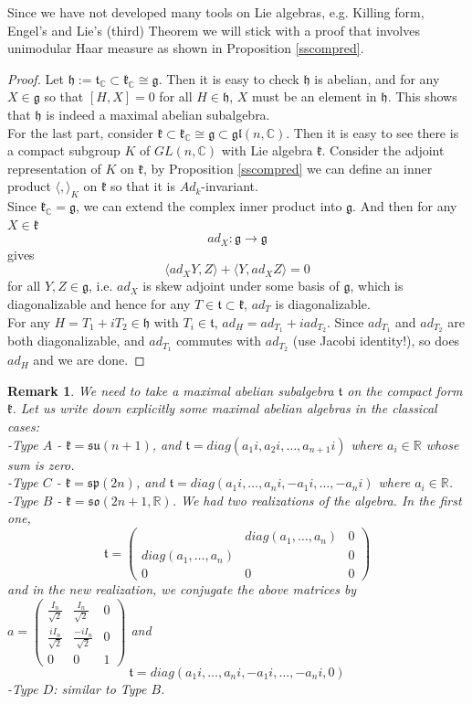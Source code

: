 \documentclass[11pt]{book}
\newtheorem{remark}[theorem]{Remark}
\newcommand{\bb}[1]{\mathbb{#1}}
\newcommand{\mf}[1]{\mathfrak{#1}}
\begin{document}
Since we have not developed many tools on Lie algebras, e.g. Killing form, Engel's and Lie's (third) Theorem we will stick with a proof that involves unimodular Haar measure as shown in Proposition \ref{sscompred}.
\begin{proof}
Let $\mf{h} := \mf{t}_{\bb{C}} \subset \mf{k}_{\bb{C}} \cong \mf{g}$. Then it is easy to check $\mf{h}$ is abelian, and for any $X \in \mf{g}$ so that $[H,X] = 0$ for all $H \in \mf{h}$, $X$ must be an element in $\mf{h}$. This shows that $\mf{h}$ is indeed a maximal abelian subalgebra.\\
For the last part, consider $\mf{k} \subset \mf{k}_{\bb{C}} \cong \mf{g} \subset \mf{gl}(n,\bb{C})$. Then it is easy to see there is a compact subgroup $K$ of $GL(n,\bb{C})$ with Lie algebra $\mf{k}$. Consider the adjoint representation of $K$ on $\mf{k}$, by Proposition \ref{sscompred} we can define an inner product $\langle , \rangle_K$ on $\mf{k}$ so that it is $Ad_k$-invariant.\\
Since $\mf{k}_{\bb{C}} = \mf{g}$, we can extend the complex inner product into $\mf{g}$. And then for any $X \in \mf{k}$
$$ad_X: \mf{g} \to \mf{g}$$
gives
$$\langle ad_XY, Z \rangle + \langle Y, ad_XZ \rangle = 0$$
for all $Y, Z \in \mf{g}$, i.e. $ad_X$ is skew adjoint under some basis of $\mf{g}$, which is diagonalizable and hence for any $T \in \mf{t} \subset \mf{k}$, $ad_T$ is diagonalizable.\\
For any $H = T_1 + iT_2 \in \mf{h}$ with $T_i \in \mf{t}$, $ad_H = ad_{T_1} + iad_{T_2}$. Since $ad_{T_1}$ and $ad_{T_2}$ are both diagonalizable, and $ad_{T_1}$ commutes with $ad_{T_2}$ (use Jacobi identity!), so does $ad_H$ and we are done.
\end{proof}
\begin{remark}
We need to take a maximal abelian subalgebra $\mf{t}$ on the compact form $\mf{k}$. Let us write down explicitly some maximal abelian algebras in the classical cases:\\
-Type $A$ - $\mf{k} = \mf{su}(n+1)$, and $\mf{t} = diag(a_1 i, a_2 i , \dots, a_{n+1} i)$ where $a_i \in \bb{R}$ whose sum is zero.\\
-Type $C$ - $\mf{k} = \mf{sp}(2n)$, and $\mf{t} = diag(a_1 i , \dots, a_{n} i, -a_1 i, \dots, -a_n i)$ where $a_i \in \bb{R}$.\\
-Type $B$ - $\mf{k} = \mf{so}(2n+1,\bb{R})$. We had two realizations of the algebra. In the first one,
$$\mf{t} = \left( \begin{array}{ccc}
 & diag(a_1, \dots, a_n) & 0 \\
diag(a_1, \dots, a_n) & & 0 \\
0 & 0 & 0 \end{array} \right)$$
and in the new realization, we conjugate the above matrices by $a = \left( \begin{array}{ccc}
\frac{I_n}{\sqrt{2}} & \frac{I_n}{\sqrt{2}}  & 0 \\
\frac{iI_n}{\sqrt{2}} & \frac{-iI_n}{\sqrt{2}} & 0 \\
0 & 0 & 1 \end{array} \right)$ and
$$\mf{t} = diag(a_1 i , \dots, a_{n} i, -a_1 i, \dots, -a_n i, 0)$$
-Type $D$: similar to Type $B$.
\end{remark}
\end{document}
